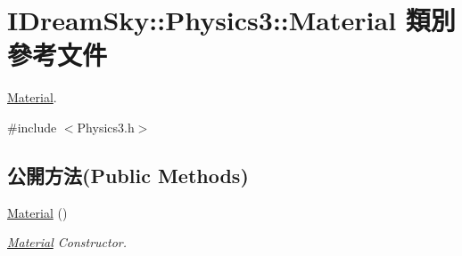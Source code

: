 \hypertarget{class_i_dream_sky_1_1_physics3_1_1_material}{}\section{I\+Dream\+Sky\+:\+:Physics3\+:\+:Material 類別 參考文件}
\label{class_i_dream_sky_1_1_physics3_1_1_material}


\hyperlink{class_i_dream_sky_1_1_physics3_1_1_material}{Material}.  




{\ttfamily \#include $<$Physics3.\+h$>$}

\subsection*{公開方法(Public Methods)}
\begin{DoxyCompactItemize}
\item 
\hyperlink{class_i_dream_sky_1_1_physics3_1_1_material_aabd1299b71ce5e401dd6bf42e28177d9}{Material} ()
\begin{DoxyCompactList}\small\item\em \hyperlink{class_i_dream_sky_1_1_physics3_1_1_material}{Material} Constructor. \end{DoxyCompactList}\end{DoxyCompactItemize}
